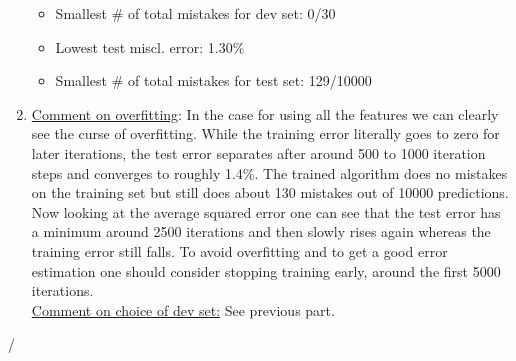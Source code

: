 \documentclass[12pt]{article}
\begin{document}
\begin{enumerate}
\begin{itemize}
		\item Smallest \# of total mistakes for dev set: 0/30
		\item Lowest test miscl. error: 1.30\%
		\item Smallest \# of total mistakes for test set: 129/10000
	\end{itemize}
	\item
	\underline{Comment on overfitting}: In the case for using all the features we can clearly see the curse of overfitting. While the training error literally goes to zero for later iterations, the test error separates after around 500 to 1000 iteration steps and converges to roughly 1.4\%. The trained algorithm does no mistakes on the training set but still does about 130 mistakes out of 10000 predictions. Now looking at the average squared error one can see that the test error has a minimum around 2500 iterations and then slowly rises again whereas the training error still falls. To avoid overfitting and to get a good error estimation one should consider stopping training early, around the first 5000 iterations. \\
	\noindent
	\underline{Comment on choice of dev set:} See previous part.
\end{enumerate}



%	




/
\end{document}
